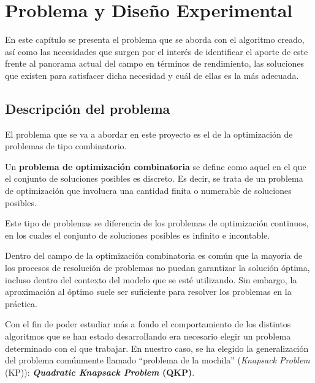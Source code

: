 \chapter{Problema y Diseño Experimental}

En este capítulo se presenta el problema que se aborda con el algoritmo creado, así como las necesidades que surgen por el interés de identificar el aporte de este frente al panorama actual del campo en términos de rendimiento, las soluciones que existen para satisfacer dicha necesidad y cuál de ellas es la más adecuada.

\section{Descripción del problema}

El problema que se va a abordar en este proyecto es el de la optimización de problemas de tipo combinatorio. 

\begin{definicion}
Un \textbf{problema de optimización combinatoria} se define como aquel en el que el conjunto de soluciones posibles es discreto. 
Es decir, se trata de un problema de optimización que involucra una cantidad finita o numerable de soluciones posibles.
\end{definicion}
Este tipo de problemas se diferencia de los problemas de optimización continuos, en los cuales el conjunto de soluciones posibles es infinito e incontable. 

Dentro del campo de la optimización combinatoria es común que la mayoría de los procesos de resolución de problemas no puedan garantizar la solución óptima, incluso dentro del contexto del modelo que se esté utilizando. 
Sin embargo, la aproximación al óptimo suele ser suficiente para resolver los problemas en la práctica. 

Con el fin de poder estudiar más a fondo el comportamiento de los distintos algoritmos que se han estado desarrollando era necesario elegir un problema determinado con el que trabajar. 
En nuestro caso, se ha elegido la generalización del problema comúnmente llamado ``problema de la mochila'' (\textit{Knapsack Problem} (KP)):  \textbf{\textit{Quadratic Knapsack Problem} (QKP)}. 

